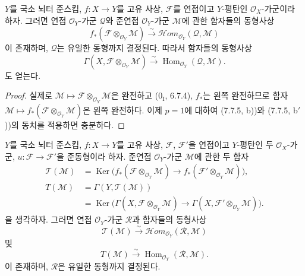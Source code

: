 \begin{theorem}[7.7.6]
$Y$를 국소 뇌터 준스킴, $f:X\to Y$를 고유 사상,
$\mathscr F$를 연접이고 $Y$-평탄인 $\mathscr O_X$-가군이라 하자.
그러면 연접 $\mathscr O_Y$-가군 $\mathscr Q$와 준연접
$\mathscr O_Y$-가군 $\mathscr M$에 관한 함자들의 동형사상
\[
  f_*(\mathscr F\otimes_{\mathscr O_Y}\mathscr M)
  \xrightarrow{\sim}
  \mathscr{H}\!om_{\mathscr O_Y}(\mathscr Q,\mathscr M)
  \tag{7.7.6.1}\label{III.7.7.6.1.fr}
\]
이 존재하며, $\mathscr Q$는 유일한 동형까지 결정된다. 따라서 함자들의
동형사상
\[
  \Gamma(X,\mathscr F\otimes_{\mathscr O_Y}\mathscr M)
  \xrightarrow{\sim}
  \operatorname{Hom}_{\mathscr O_Y}(\mathscr Q,\mathscr M).
  \tag{7.7.6.2}\label{III.7.7.6.2.fr}
\]
도 얻는다.
\end{theorem}

\begin{proof}
실제로 $\mathscr M\mapsto\mathscr F\otimes_{\mathscr O_Y}\mathscr M$은
완전하고 ($0_{\mathrm I}$, 6.7.4), $f_*$는 왼쪽 완전하므로 함자
$\mathscr M\mapsto f_*(\mathscr F\otimes_{\mathscr O_Y}\mathscr M)$은
왼쪽 완전하다. 이제 $p=1$에 대하여 (7.7.5, b))와 (7.7.5, b$'$))의
동치를 적용하면 충분하다.
\end{proof}

\begin{corollary}[7.7.7]
$Y$를 국소 뇌터 준스킴, $f:X\to Y$를 고유 사상,
$\mathscr F$, $\mathscr F'$을 연접이고 $Y$-평탄인 두
$\mathscr O_X$-가군, $u:\mathscr F\to\mathscr F'$을 준동형이라 하자.
준연접 $\mathscr O_Y$-가군 $\mathscr M$에 관한 두 함자
\begin{align*}
  \mathscr T(\mathscr M)
  &=
  \operatorname{Ker}
  \bigl(
    f_*(\mathscr F\otimes_{\mathscr O_Y}\mathscr M)
    \longrightarrow
    f_*(\mathscr F'\otimes_{\mathscr O_Y}\mathscr M)
  \bigr),\\
  T(\mathscr M)
  &=
  \Gamma(Y,\mathscr T(\mathscr M))\\
  &=
  \operatorname{Ker}
  \bigl(
    \Gamma(X,\mathscr F\otimes_{\mathscr O_Y}\mathscr M)
    \longrightarrow
    \Gamma(X,\mathscr F'\otimes_{\mathscr O_Y}\mathscr M)
  \bigr).
\end{align*}
을 생각하자. 그러면 연접 $\mathscr O_Y$-가군 $\mathscr R$과 함자들의
동형사상
\[
  \mathscr T(\mathscr M)
  \xrightarrow{\sim}
  \mathscr{H}\!om_{\mathscr O_Y}(\mathscr R,\mathscr M)
  \tag{7.7.7.1}\label{III.7.7.7.1.fr}
\]
및
\[
  T(\mathscr M)
  \xrightarrow{\sim}
  \operatorname{Hom}_{\mathscr O_Y}(\mathscr R,\mathscr M).
  \tag{7.7.7.2}\label{III.7.7.7.2.fr}
\]
이 존재하며, $\mathscr R$은 유일한 동형까지 결정된다.
\end{corollary}

